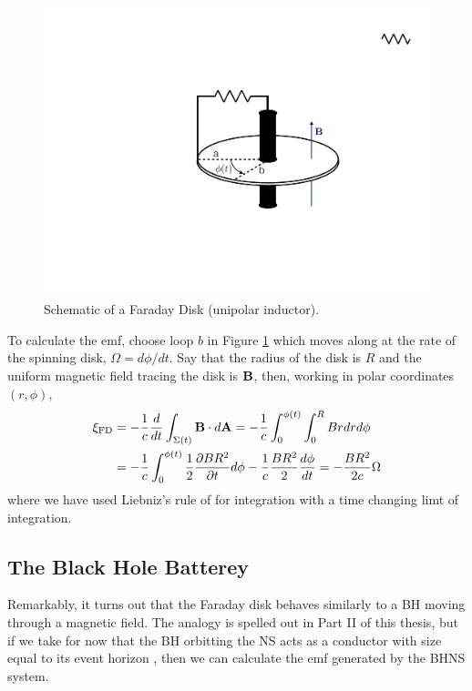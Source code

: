 \begin{figure}
\begin{center}
\includegraphics[scale=0.33]{figures/ch0/UI_schematic} 
\end{center}
\caption{Schematic of a Faraday Disk (unipolar inductor).}
\label{Fig:FDschem}
\end{figure}


To calculate the emf, choose loop $b$ in Figure \ref{Fig:FDschem} which moves
along at the rate of the spinning disk, $\Omega = d\phi/dt$. Say that the
radius of the disk is $R$ and the uniform magnetic field tracing the disk is ${\bf B}$, then, working in polar coordinates $(r, \phi)$,
\begin{align}
\xi_{\rm FD} &= - \frac{1}{c} \frac{d}{dt} \int_{\Sigma(t)}{{\bf B} \cdot d{\bf A}} =  - \frac{1}{c} \int^{\phi(t)}_{0} \int^{R}_{0}{B r dr d\phi}  \\
&= - \frac{1}{c} \int^{\phi(t)}_{0}{\frac{1}{2}\frac{\partial B R^2}{\partial t} d\phi} -  \frac{1}{c} \frac{B R^2}{2} \frac{d\phi}{dt}  = -\frac{B R^2}{2c} \Omega
\end{align}
where we have used Liebniz's rule of for integration with a time changing limt of integration. 

\subsection{The Black Hole Batterey} 
Remarkably, it turns out that the Faraday
disk behaves similarly to a BH moving through a magnetic field. The analogy is
spelled out in Part II of this thesis, but if we take for now that the BH
orbitting the NS acts as a conductor with size equal to its event horizon
\citep{MPBook}, then we can calculate the emf generated by the BHNS system.


